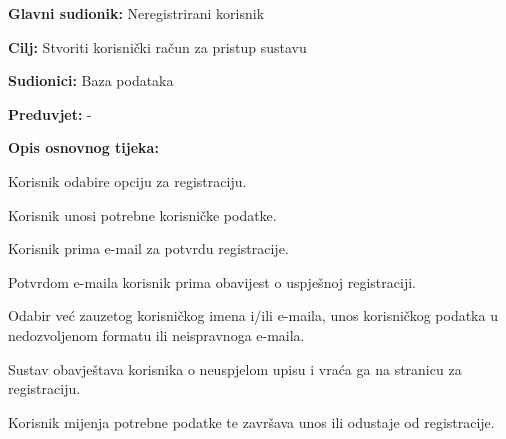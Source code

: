				\noindent {}
				\begin{packed_item}
					
					\item \textbf{Glavni sudionik: }Neregistrirani korisnik
					\item  \textbf{Cilj:} Stvoriti korisnički račun za pristup sustavu
					\item  \textbf{Sudionici:} Baza podataka
					\item  \textbf{Preduvjet:} -
					\item  \textbf{Opis osnovnog tijeka:}
					
					\item Korisnik odabire opciju za registraciju.
					\item Korisnik unosi potrebne korisničke podatke.
					\item Korisnik prima e-mail za potvrdu registracije.
					\item Potvrdom e-maila korisnik prima obavijest o uspješnoj registraciji.
					\item[] \begin{packed_item}
						
						\item[2.a] Odabir već zauzetog korisničkog imena i/ili e-maila, unos korisničkog podatka u nedozvoljenom formatu ili neispravnoga e-maila.
						\item[] \begin{packed_enum}
							
							\item Sustav obavještava korisnika o neuspjelom upisu i vraća ga na stranicu za registraciju.
							\item Korisnik mijenja potrebne podatke te završava unos ili odustaje od registracije.
							
						\end{packed_enum}
						
					\end{packed_item}
				\end{packed_item}
				\noindent {}
